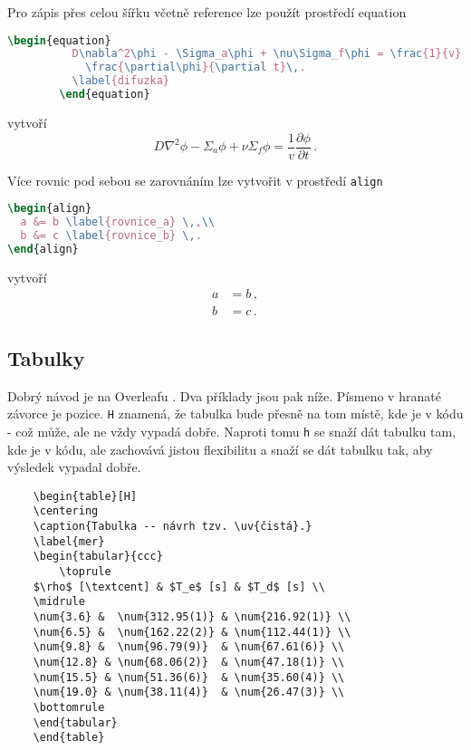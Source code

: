 \documentclass{cygclanek}
\begin{document}
Pro zápis přes celou šířku včetně reference lze použít prostředí equation
    \begin{lstlisting}[language=TeX]
        \begin{equation}
          D\nabla^2\phi - \Sigma_a\phi + \nu\Sigma_f\phi = \frac{1}{v}
            \frac{\partial\phi}{\partial t}\,.
          \label{difuzka}
        \end{equation}
    \end{lstlisting}
    vytvoří 
\begin{equation}
  D\nabla^2\phi - \Sigma_a\phi + \nu\Sigma_f\phi = \frac{1}{v}\frac{\partial
  \phi}{\partial t}\,.
  \label{difuzka}
\end{equation}

Více rovnic pod sebou se zarovnáním lze vytvořit v prostředí \verb|align|
\begin{lstlisting}[language=TeX]
\begin{align}
  a &= b \label{rovnice_a} \,,\\
  b &= c \label{rovnice_b} \,.
\end{align}
\end{lstlisting}
vytvoří
\begin{align}
  a &= b \label{rovnice_a} \,,\\
  b &= c \label{rovnice_b} \,.
\end{align}


\subsection{Tabulky}

Dobrý návod je na Overleafu \cite{overleaf_tables}. Dva příklady jsou pak níže. Písmeno v hranaté závorce 
je pozice. \verb|H| znamená, že tabulka bude přesně na tom místě, kde je v kódu - což může, ale ne vždy 
vypadá dobře. Naproti tomu \verb|h| se snaží dát tabulku tam, kde je v kódu, ale zachovává jistou flexibilitu 
a snaží se dát tabulku tak, aby výsledek vypadal dobře.

\begin{verbatim}
    \begin{table}[H]
    \centering
    \caption{Tabulka -- návrh tzv. \uv{čistá}.}
    \label{mer}
    \begin{tabular}{ccc}
    	\toprule
    $\rho$ [\textcent] & $T_e$ [s] & $T_d$ [s] \\
    \midrule
    \num{3.6} &  \num{312.95(1)} & \num{216.92(1)} \\
    \num{6.5} &  \num{162.22(2)} & \num{112.44(1)} \\
    \num{9.8} &  \num{96.79(9)}  & \num{67.61(6)} \\
    \num{12.8} & \num{68.06(2)}  & \num{47.18(1)} \\
    \num{15.5} & \num{51.36(6)}  & \num{35.60(4)} \\
    \num{19.0} & \num{38.11(4)}  & \num{26.47(3)} \\
    \bottomrule
    \end{tabular}
    \end{table}
\end{verbatim}
\end{document}
